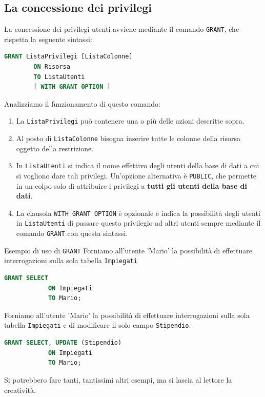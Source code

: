 \documentclass[12pt]{report}
\begin{document}
	\subsection{La concessione dei privilegi}
	La concessione dei privilegi utenti avviene mediante il comando \texttt{GRANT}, che rispetta la seguente sintassi:
	\begin{lstlisting}[language=SQL]
		GRANT ListaPrivilegi [ListaColonne]
		ON Risorsa
		TO ListaUtenti
		[ WITH GRANT OPTION ]
	\end{lstlisting}
	Analizziamo il funzionamento di questo comando:
	\begin{enumerate}
		\item La \texttt{ListaPrivilegi} può contenere una o più delle azioni descritte sopra.
		
		\item Al posto di \texttt{ListaColonne} bisogna inserire tutte le colonne della risorsa oggetto della restrizione.
		
		\item In \texttt{ListaUtenti} si indica il nome effettivo degli utenti della base di dati a cui si vogliono dare tali privilegi. Un'opzione alternativa è \texttt{PUBLIC}, che permette in un colpo solo di attribuire i privilegi a \textbf{tutti gli utenti della base di dati}.
		
		\item La clausola \texttt{WITH GRANT OPTION} è opzionale e indica la possibilità degli utenti in \texttt{ListaUtenti} di passare questo privilegio ad altri utenti sempre mediante il comando \texttt{GRANT} con questa sintassi.
	\end{enumerate}
	
	\begin{esempio}{Esempio di uso di \texttt{GRANT}}{}
		Forniamo all'utente 'Mario' la possibilità di effettuare interrogazioni sulla sola tabella \texttt{Impiegati}
		\begin{lstlisting}[language=SQL]
			GRANT SELECT
			ON Impiegati
			TO Mario;
		\end{lstlisting}
		
		Forniamo all'utente 'Mario' la possibilità di effettuare interrogazioni sulla sola tabella \texttt{Impiegati} e di modificare il solo campo \texttt{Stipendio}.
		\begin{lstlisting}[language=SQL]
			GRANT SELECT, UPDATE (Stipendio)
			ON Impiegati
			TO Mario;
		\end{lstlisting}
		
		Si potrebbero fare tanti, tantissimi altri esempi, ma si lascia al lettore la creatività.
	\end{esempio}
	
\end{document}
